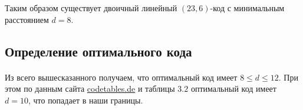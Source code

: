 \documentclass[fontsize=14pt]{article}
\begin{document}
Таким образом существует двоичный линейный $(23, 6)$-код с минимальным расстоянием $d = 8$.

\subsection*{Определение оптимального кода}

\paragraph*{}
Из всего вышесказанного получаем, что оптимальный код имеет $8 \leq d \leq 12$. При этом по данным сайта \href{http://www.codetables.de}{codetables.de} и таблицы $3.2$ оптимальный код имеет $d = 10$, что попадает в наши границы.
\end{document}
